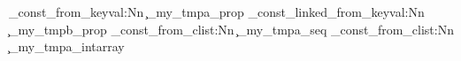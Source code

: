 \ExplSyntaxOn
\prop_const_from_keyval:Nn
  \c_my_tmpa_prop
  { }
\prop_const_linked_from_keyval:Nn
  \c_my_tmpb_prop
  { }
\seq_const_from_clist:Nn
  \c_my_tmpa_seq
  { }
\intarray_const_from_clist:Nn
  \c_my_tmpa_intarray
  { }
\ExplSyntaxOff
